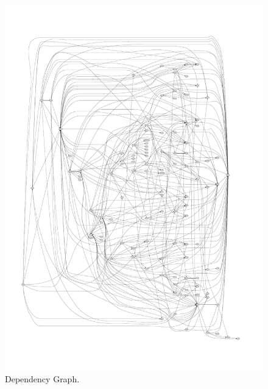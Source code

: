 \documentclass[10.5pt,journal, a4paper]{IEEEtran}
\begin{document}
\begin{figure}[]
 \centering 
 \includegraphics[width=\columnwidth]{freevo19less}
 \centering 
  \caption {Dependency Graph. }
 \end{figure}














\end{document}
